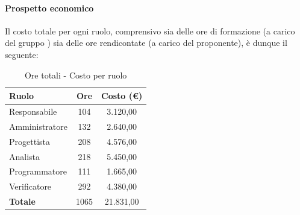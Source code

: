 \documentclass[../PianoProgetto.tex]{subfiles}
\begin{document}
\vfill	
	
	\paragraph{Prospetto economico}
					Il costo totale per ogni ruolo, comprensivo sia delle ore di formazione (a carico del gruppo \leaf) sia delle ore rendicontate (a carico del proponente), è dunque il seguente:
	\begin{table}[h]
		\centering
		\begin{tabular}{l * {2}{c}}
			\toprule
			\textbf{Ruolo} & \textbf{Ore} & \textbf{Costo (\euro{})} \\
			\midrule
			Responsabile &	104 & 3.120,00 \\
			Amministratore & 132 & 2.640,00 \\
			Progettista & 208 & 4.576,00 \\
			Analista & 218 & 5.450,00 \\
			Programmatore & 111 & 1.665,00 \\
			Verificatore & 292 & 4.380,00 \\
			\midrule		
			\textbf{Totale} & 1065 &  21.831,00 \\
			\bottomrule
		\end{tabular}
		\caption{Ore totali - Costo per ruolo}
		\label{tab:totale_costo}
	\end{table}
\vfill
\newpage	
\vfill
	
\end{document}
